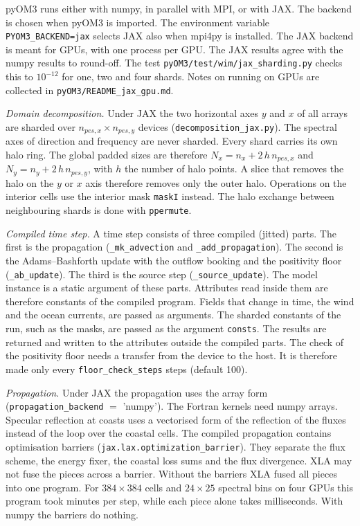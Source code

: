 \documentclass[12pt]{article}
\begin{document}
pyOM3 runs either with numpy, in parallel with MPI, or with JAX.
The backend is chosen when pyOM3 is imported.
The environment variable \verb|PYOM3_BACKEND=jax| selects JAX also when mpi4py is installed.
The JAX backend is meant for GPUs, with one process per GPU.
The JAX results agree with the numpy results to round-off.
The test \verb|pyOM3/test/wim/jax_sharding.py| checks this to $10^{-12}$ for one, two and four shards.
Notes on running on GPUs are collected in \verb|pyOM3/README_jax_gpu.md|.

\emph{Domain decomposition.} Under JAX the two horizontal axes $y$ and $x$ of all arrays
are sharded over $n_{pes,x} \times n_{pes,y}$ devices (\verb|decomposition_jax.py|).
The spectral axes of direction and frequency are never sharded.
Every shard carries its own halo ring.
The global padded sizes are therefore $N_x = n_x + 2\, h\, n_{pes,x}$ and $N_y = n_y + 2\, h\, n_{pes,y}$,
with $h$ the number of halo points.
A slice that removes the halo on the $y$ or $x$ axis therefore removes only the outer halo.
Operations on the interior cells use the interior mask \verb|maskI| instead.
The halo exchange between neighbouring shards is done with \verb|ppermute|.

\emph{Compiled time step.} A time step consists of three compiled (jitted) parts.
The first is the propagation (\verb|_mk_advection| and \verb|_add_propagation|).
The second is the Adams--Bashforth update with the outflow booking and the positivity floor (\verb|_ab_update|).
The third is the source step (\verb|_source_update|).
The model instance is a static argument of these parts.
Attributes read inside them are therefore constants of the compiled program.
Fields that change in time, the wind and the ocean currents, are passed as arguments.
The sharded constants of the run, such as the masks, are passed as the argument \verb|consts|.
The results are returned and written to the attributes outside the compiled parts.
The check of the positivity floor needs a transfer from the device to the host.
It is therefore made only every \verb|floor_check_steps| steps (default 100).

\emph{Propagation.} Under JAX the propagation uses the array form (\verb|propagation_backend| $=$ 'numpy').
The Fortran kernels need numpy arrays.
Specular reflection at coasts uses a vectorised form of the reflection of the fluxes
instead of the loop over the coastal cells.
The compiled propagation contains optimisation barriers (\verb|jax.lax.optimization_barrier|).
They separate the flux scheme, the energy fixer, the coastal loss sums and the flux divergence.
XLA may not fuse the pieces across a barrier.
Without the barriers XLA fused all pieces into one program.
For $384 \times 384$ cells and $24 \times 25$ spectral bins on four GPUs this program took minutes per step,
while each piece alone takes milliseconds.
With numpy the barriers do nothing.
\end{document}
